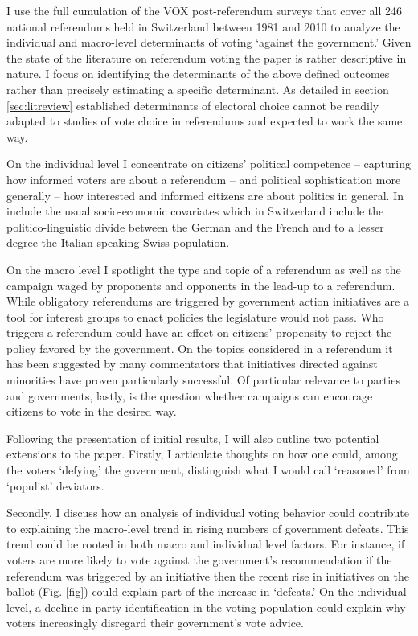 \documentclass[11pt,a4paper]{article}
\begin{document}
    I use the full cumulation of the VOX post-referendum surveys that cover all 246 national referendums held in Switzerland between 1981 and 2010 to analyze the individual and macro-level determinants of voting `against the government.' Given the state of the literature on referendum voting the paper is rather descriptive in nature. I focus on identifying the determinants of the above defined outcomes rather than precisely estimating a specific determinant. As detailed in section \ref{sec:litreview} established determinants of electoral choice cannot be readily adapted to studies of vote choice in referendums and expected to work the same way. 
    
    On the individual level I concentrate on citizens' political competence -- capturing how informed voters are about a referendum -- and political sophistication more generally -- how interested and informed citizens are about politics in general. In include the usual socio-economic covariates which in Switzerland include the politico-linguistic divide between the German and the French and to a lesser degree the Italian speaking Swiss population. 
    
    On the macro level I spotlight the type and topic of a referendum as well as the campaign waged by proponents and opponents in the lead-up to a referendum. While obligatory referendums are triggered by government action initiatives are a tool for interest groups to enact policies the legislature would not pass. Who triggers a referendum could have an effect on citizens' propensity to reject the policy favored by the government. On the topics considered in a referendum it has been suggested by many commentators that initiatives directed against minorities have proven particularly successful. Of particular relevance to parties and governments, lastly, is the question whether campaigns can encourage citizens to vote in the desired way.
    
    Following the presentation of initial results, I will also outline two potential extensions to the paper. Firstly, I articulate thoughts on how one could, among the voters `defying' the government, distinguish what I would call `reasoned' from `populist' deviators.  
    
    Secondly, I discuss how an analysis of individual voting behavior could contribute to explaining the macro-level trend in rising numbers of government defeats. This trend could be rooted in both macro and individual level factors. For instance, if voters are more likely to vote against the government's recommendation if the referendum was triggered by an initiative then the recent rise in initiatives on the ballot (Fig. \ref{fig}) could explain part of the increase in `defeats.' On the individual level, a decline in party identification in the voting population could explain why voters increasingly disregard their government's vote advice.
\end{document}
